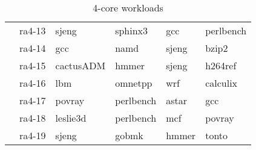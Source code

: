 \begin{table}[ht]
{\begin{tabular}{|r|lllll|}
			 & ra4-13	 & sjeng & sphinx3 & gcc & perlbench \\ 
			 & ra4-14	 & gcc & namd & sjeng & bzip2 \\ 
			 & ra4-15	 & cactusADM & hmmer & sjeng & h264ref \\ 
			 & ra4-16	 & lbm & omnetpp & wrf & calculix \\ 
			 & ra4-17	 & povray & perlbench & astar & gcc \\ 
			 & ra4-18	 & leslie3d & perlbench & mcf & povray \\ 
			 & ra4-19	 & sjeng & gobmk & hmmer & tonto \\ 
\hline
\end{tabular}%
} 
\caption{4-core workloads}
\label{tbl:benchmark_workloads:4-workloads}
\end{table}
